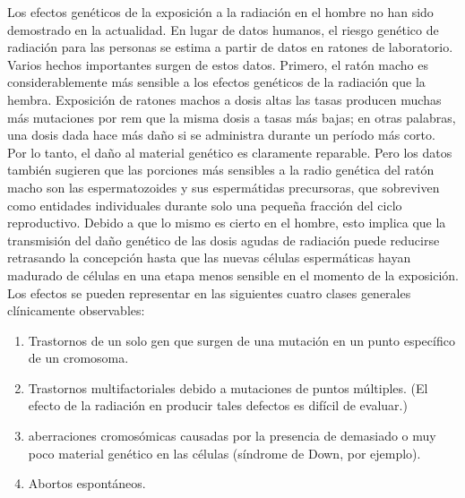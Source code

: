 \documentclass[]{article}
\begin{document}
Los efectos genéticos de la exposición a la radiación en el hombre no han sido
demostrado en la actualidad. En lugar de datos humanos, el riesgo genético de radiación para las personas se estima a partir de datos en ratones de laboratorio. Varios hechos importantes surgen de estos datos. Primero, el ratón macho es considerablemente más sensible a los efectos genéticos de la radiación que la hembra. Exposición de ratones machos a dosis altas
las tasas producen muchas más mutaciones por rem que la misma dosis a tasas más bajas; en otras palabras, una dosis dada hace más daño si se administra durante un período más corto.\\

Por lo tanto, el daño al material genético es claramente reparable. Pero los datos también sugieren que las porciones más sensibles a la radio genética del ratón macho son las espermatozoides y sus espermátidas precursoras, que sobreviven como entidades individuales durante solo una pequeña fracción del ciclo reproductivo. Debido a que lo mismo es cierto en el hombre, esto implica que la transmisión del daño genético de las dosis agudas de radiación puede reducirse retrasando la concepción hasta que las nuevas células espermáticas hayan madurado de células en una etapa menos sensible en el momento de la exposición.\\



Los efectos se pueden representar en las siguientes cuatro clases generales clínicamente observables:

\begin{enumerate}
	\item  Trastornos de un solo gen que surgen de una mutación en un punto específico de un cromosoma.
	\item Trastornos multifactoriales debido a mutaciones de puntos múltiples. (El efecto de la radiación
	en producir tales defectos es difícil de evaluar.)
	\item aberraciones cromosómicas causadas por la presencia de demasiado o muy poco
	material genético en las células (síndrome de Down, por ejemplo).
	\item Abortos espontáneos.	
\end{enumerate}
\end{document}
